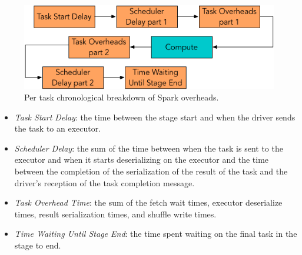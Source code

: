 \begin{figure}[thb!]
\begin{center}
\includegraphics[width=.5\textwidth]{fig/spark_overheads.png}
\caption{Per task chronological breakdown of Spark overheads.}
\label{fig:overheads}
\end{center}
\end{figure}

\begin{itemize}[noitemsep,topsep=0mm]
  \item \emph{Task Start Delay}: the time between the stage start and when the driver sends the task to an executor.
  \item \emph{Scheduler Delay}: the sum of the time between when the task is sent to the executor and when it starts deserializing on the executor and the time between the completion of the serialization of the result of the task and the driver's reception of the task completion message.
  \item \emph{Task Overhead Time}: the sum of the fetch wait times, executor deserialize times, result serialization times, and shuffle write times.
  \item \emph{Time Waiting Until Stage End}: the time spent waiting on the final task in the stage to end.
\end{itemize}



